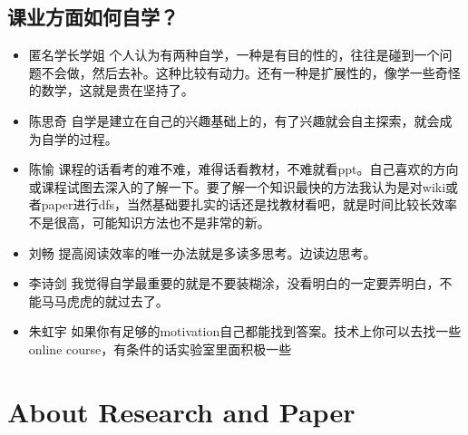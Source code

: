 \documentclass{vivid_layout}
\begin{document}
\subsection{课业方面如何自学？}
\begin{itemize}
\item {\name 匿名学长学姐}  \quad 个人认为有两种自学，一种是有目的性的，往往是碰到一个问题不会做，然后去补。这种比较有动力。还有一种是扩展性的，像学一些奇怪的数学，这就是贵在坚持了。
\item { 陈思奇} \quad 自学是建立在自己的兴趣基础上的，有了兴趣就会自主探索，就会成为自学的过程。
\item { 陈愉}  \quad  课程的话看考的难不难，难得话看教材，不难就看ppt。自己喜欢的方向或课程试图去深入的了解一下。要了解一个知识最快的方法我认为是对wiki或者paper进行dfs，当然基础要扎实的话还是找教材看吧，就是时间比较长效率不是很高，可能知识方法也不是非常的新。
\item  { 刘畅}  \quad 提高阅读效率的唯一办法就是多读多思考。边读边思考。
\item  { 李诗剑}  \quad 我觉得自学最重要的就是不要装糊涂，没看明白的一定要弄明白，不能马马虎虎的就过去了。
\item  { 朱虹宇}  \quad 如果你有足够的motivation自己都能找到答案。技术上你可以去找一些online course，有条件的话实验室里面积极一些
\end{itemize}

\section{About Research and Paper}
\addtocounter{section}{1}
\setcounter{subsection}{0}
\end{document}
